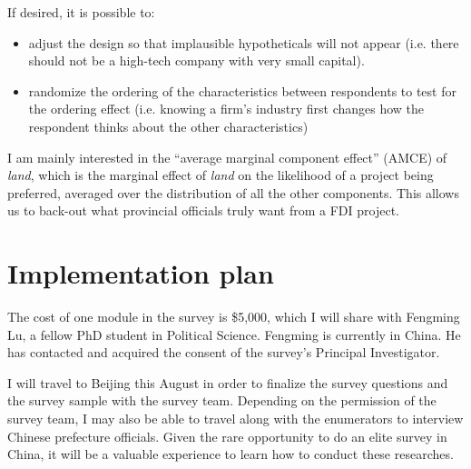 \documentclass[12pt]{article}
\begin{document}
If desired, it is possible to:
\begin{itemize}
\item adjust the design so that implausible hypotheticals will not appear (i.e. there should not be a high-tech company with very small capital).
\item randomize the ordering of the characteristics between respondents to test for the ordering effect (i.e. knowing a firm's industry first changes how the respondent thinks about the other characteristics)
\end{itemize}

I am mainly interested in the ``average marginal component effect'' (AMCE) of \textit{land}, which is the marginal effect of \textit{land} on the likelihood of a project being preferred, averaged over the distribution of all the other components. This allows us to back-out what provincial officials truly want from a FDI project.


\section{Implementation plan}

The cost of one module in the survey is \$5,000, which I will share with Fengming Lu, a fellow PhD student in Political Science. Fengming is currently in China. He has contacted and acquired the consent of the survey's Principal Investigator.

I will travel to Beijing this August in order to finalize the survey questions and the survey sample with the survey team. Depending on the permission of the survey team, I may also be able to travel along with the enumerators to interview Chinese prefecture officials. Given the rare opportunity to do an elite survey in China, it will be a valuable experience to learn how to conduct these researches.

\clearpage


\end{document}
